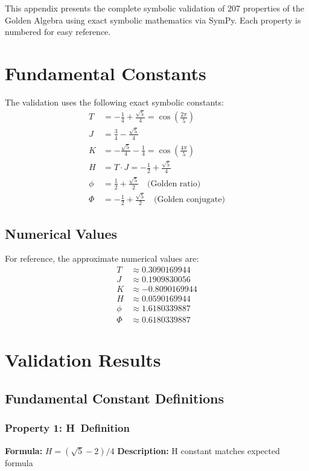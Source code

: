 This appendix presents the complete symbolic validation of 207 properties of the Golden Algebra using exact symbolic mathematics via SymPy. Each property is numbered for easy reference.

\section{Fundamental Constants}
The validation uses the following exact symbolic constants:
\begin{align*}
T &= - \frac{1}{4} + \frac{\sqrt{5}}{4} = \cos\left(\frac{2\pi}{5}\right) \\
J &= \frac{3}{4} - \frac{\sqrt{5}}{4} \\
K &= - \frac{\sqrt{5}}{4} - \frac{1}{4} = \cos\left(\frac{4\pi}{5}\right) \\
H &= T \cdot J = - \frac{1}{2} + \frac{\sqrt{5}}{4} \\
\phi &= \frac{1}{2} + \frac{\sqrt{5}}{2} \quad \text{(Golden ratio)} \\
\Phi &= - \frac{1}{2} + \frac{\sqrt{5}}{2} \quad \text{(Golden conjugate)}
\end{align*}

\subsection{Numerical Values}
For reference, the approximate numerical values are:
\begin{align*}
T &\approx 0.3090169944 \\
J &\approx 0.1909830056 \\
K &\approx -0.8090169944 \\
H &\approx 0.0590169944 \\
\phi &\approx 1.6180339887 \\
\Phi &\approx 0.6180339887
\end{align*}

\section{Validation Results}

\subsection{Fundamental Constant Definitions}

\subsubsection*{Property 1: H~Definition}
\textbf{Formula:} $H = (\sqrt{5} - 2)/4$
\textbf{Description:} H constant matches expected formula

